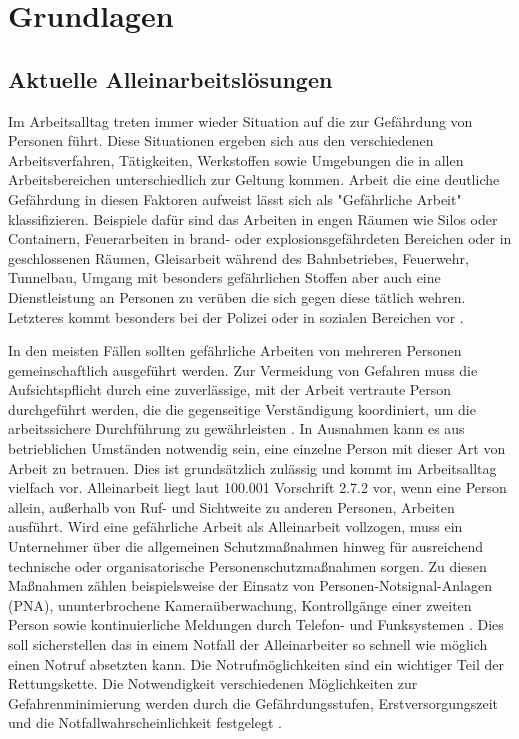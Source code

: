 \documentclass[thesis.tex]{subfiles}
\begin{document}
\chapter{Grundlagen}\label{chap:grundlagen}

\section{Aktuelle Alleinarbeitslösungen}

Im Arbeitsalltag treten immer wieder Situation auf die zur Gefährdung von Personen führt.
Diese Situationen ergeben sich aus den verschiedenen Arbeitsverfahren, Tätigkeiten, Werkstoffen sowie Umgebungen die in allen Arbeitsbereichen unterschiedlich zur Geltung kommen.
Arbeit die eine deutliche Gefährdung in diesen Faktoren aufweist lässt sich als "Gefährliche Arbeit" klassifizieren.
Beispiele dafür sind das Arbeiten in engen Räumen wie Silos oder Containern, Feuerarbeiten in brand- oder explosionsgefährdeten Bereichen oder in geschlossenen Räumen, Gleisarbeit während des Bahnbetriebes, Feuerwehr, Tunnelbau, Umgang mit besonders gefährlichen Stoffen aber auch eine Dienstleistung an Personen zu verüben die sich gegen diese tätlich wehren.
Letzteres kommt besonders bei der Polizei oder in sozialen Bereichen vor \cite[vgl. S.41 2.7.1]{Regel_100-001}.

In den meisten Fällen sollten gefährliche Arbeiten von mehreren Personen gemeinschaftlich ausgeführt werden.
Zur Vermeidung von Gefahren muss die Aufsichtspflicht durch eine zuverlässige, mit der Arbeit vertraute Person durchgeführt werden, die die gegenseitige Verständigung koordiniert, um die arbeitssichere Durchführung zu gewährleisten \cite[vgl. §8.1]{Vorschrift1_DGUV}.
In Ausnahmen kann es aus betrieblichen Umständen notwendig sein, eine einzelne Person mit dieser Art von Arbeit zu betrauen. Dies ist grundsätzlich zulässig und kommt im Arbeitsalltag vielfach vor.
Alleinarbeit liegt laut 100.001 Vorschrift 2.7.2 vor, wenn eine Person allein, außerhalb von Ruf- und Sichtweite zu anderen Personen, Arbeiten ausführt.
Wird eine gefährliche Arbeit als Alleinarbeit vollzogen, muss ein Unternehmer über die allgemeinen Schutzmaßnahmen hinweg für ausreichend technische oder organisatorische Personenschutzmaßnahmen sorgen.
Zu diesen Maßnahmen zählen beispielsweise der Einsatz von Personen-Notsignal-Anlagen (PNA), ununterbrochene Kameraüberwachung, Kontrollgänge einer zweiten Person sowie kontinuierliche Meldungen durch Telefon- und Funksystemen \cite[vgl. S.43 2.7.2]{Regel_100-001}.
Dies soll sicherstellen das in einem Notfall der Alleinarbeiter so schnell wie möglich einen Notruf absetzten kann.
Die Notrufmöglichkeiten sind ein wichtiger Teil der Rettungskette.
Die Notwendigkeit verschiedenen Möglichkeiten zur Gefahrenminimierung werden durch die Gefährdungsstufen, Erstversorgungszeit und die Notfallwahrscheinlichkeit festgelegt \cite[vgl. S.13-18]{Regel_112-139}.
\end{document}
